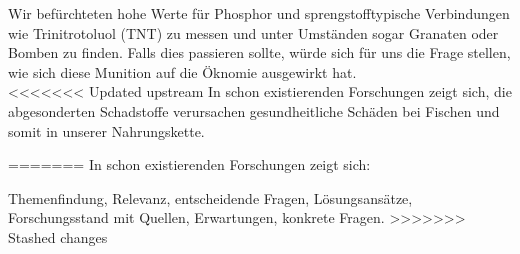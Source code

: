 Wir befürchteten hohe Werte für Phosphor und sprengstofftypische Verbindungen wie Trinitrotoluol (TNT) 
zu messen und unter Umständen sogar Granaten oder Bomben zu finden. Falls dies passieren sollte, würde 
sich für uns die Frage stellen, wie sich diese Munition auf die Öknomie ausgewirkt hat. \\

<<<<<<< Updated upstream
In schon existierenden Forschungen zeigt sich, die abgesonderten Schadstoffe verursachen gesundheitliche Schäden bei Fischen 
und somit in unserer Nahrungskette. 
%
%
%

=======
In schon existierenden Forschungen\cite{munitionsbelastung} zeigt sich:




Themenfindung, Relevanz, entscheidende Fragen, Lösungsansätze, Forschungsstand mit Quellen, Erwartungen, konkrete Fragen.
>>>>>>> Stashed changes
